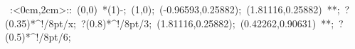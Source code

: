 %


\hbox{
\xy    <2cm,0cm>:<0cm,2cm>::
       (0,0) *\ellipse(1){-}; (1,0);
       (-0.96593,0.25882); (1.81116,0.25882) **\dir{-}; 
       ?(0.35)*^!/8pt/{x};  ?(0.8)*^!/8pt/{3}; 
       (1.81116,0.25882); (0.42262,0.90631) **\dir{-};
       ?(0.5)*^!/8pt/{6};        
\endxy}


